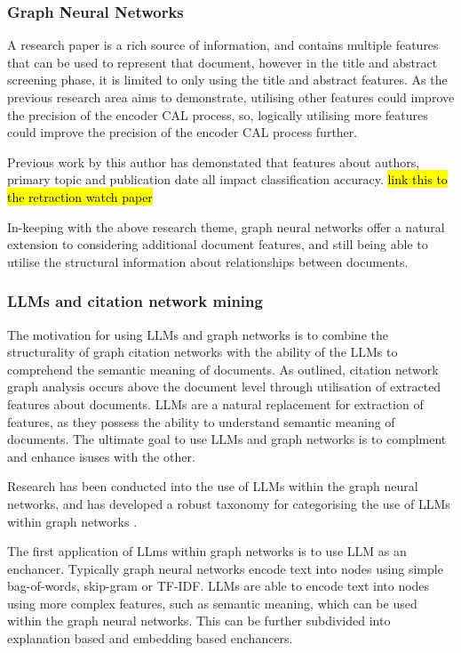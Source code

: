 \documentclass[10pt, english]{article}
\begin{document}
    
\subsubsection{Graph Neural Networks}

    A research paper is a rich source of information, and contains multiple features that can be used to represent that document, however in the title and abstract screening phase, it is limited to only using the title and abstract features. As the previous research area aims to demonstrate, utilising other features could improve the precision of the encoder CAL process, so, logically utilising more features could improve the precision of the encoder CAL process further. 

    Previous work by this author has demonstated that features about authors, primary topic and publication date all impact classification accuracy. \hl{link this to the retraction watch paper}

    In-keeping with the above research theme, graph neural networks offer a natural extension to considering additional document features, and still being able to utilise the structural information about relationships between documents. 

    
    \subsubsection{LLMs and citation network mining}

    The motivation for using LLMs and graph networks is to combine the structurality of graph citation networks with the ability of the LLMs to comprehend the semantic meaning of documents. As outlined, citation network graph analysis occurs above the document level through utilisation of extracted features about documents. LLMs are a natural replacement for extraction of features, as they possess the ability to understand semantic meaning of documents. The ultimate goal to use LLMs and graph networks is to complment and enhance isuses with the other. 

    Research has been conducted into the use of LLMs within the graph neural networks, and has developed a robust taxonomy for categorising the use of LLMs within graph networks \cite{llm4g}. 
    
    The first application of LLms within graph networks is to use LLM as an enchancer. Typically graph neural networks encode text into nodes using simple bag-of-words, skip-gram or TF-IDF. LLMs are able to encode text into nodes using more complex features, such as semantic meaning, which can be used within the graph neural networks. This can be further subdivided into explanation based and embedding based enchancers. 
    
\end{document}
